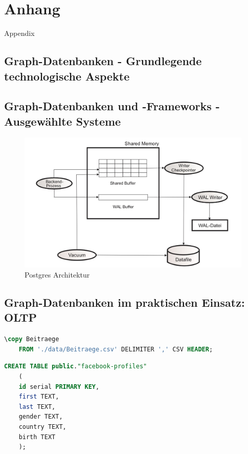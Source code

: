 \appendix
\chapter{Anhang}
Appendix
\section{Graph-Datenbanken - Grundlegende technologische Aspekte}
\section{Graph-Datenbanken und -Frameworks - Ausgewählte Systeme}
\begin{figure}[H]

    \includegraphics[width = \linewidth]{images/postgresArchitektur.jpg}
    \caption{Postgres Architektur}
    \label{Postgres Architektur}

\end{figure}
\section{Graph-Datenbanken im praktischen Einsatz: OLTP}
\begin{lstlisting}[language=SQL,caption=CSV Input,frame=single]
    \copy Beitraege
    FROM './data/Beitraege.csv' DELIMITER ',' CSV HEADER;
\end{lstlisting}


\begin{lstlisting}[language=SQL,caption=Anlegen der Tabelle facebook-profiles,frame=single]
    CREATE TABLE public."facebook-profiles"
    (
    id serial PRIMARY KEY,
    first TEXT,
    last TEXT,
    gender TEXT,
    country TEXT,
    birth TEXT
    );
\end{lstlisting}

